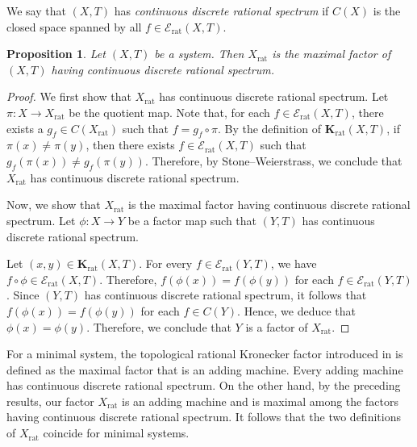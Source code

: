 \documentclass[11pt,reqno]{amsart}
\newcommand{\Krat}{\mathbf{K}_{\operatorname{rat}}}
\newtheorem{proposition}[proposition]{Proposition}
\theoremstyle{definition}
\theoremstyle{remark}
\begin{document}
We say that $(X,T)$ has \emph{continuous discrete rational spectrum} if $C(X)$ is the closed space spanned by all $f\in \mathcal{E}_{\operatorname{rat}}(X,T)$.

\begin{proposition}
    Let $(X,T)$ be a system. Then $X_{\operatorname{rat}}$ is the maximal factor of $(X,T)$ having continuous discrete rational spectrum.
\end{proposition}

\begin{proof}
    We first show that $X_{\operatorname{rat}}$ has continuous discrete rational spectrum. Let $\pi: X\to X_{\operatorname{rat}}$ be the quotient map. Note that, for each $f\in \mathcal{E}_{\operatorname{rat}}(X,T)$, there exists a $g_f\in C(X_{\operatorname{rat}})$ such that $f=g_f \circ \pi$. By the definition of $\Krat(X,T)$, if $\pi(x)\neq\pi(y)$, then there exists $f\in \mathcal{E}_{\operatorname{rat}}(X,T)$ such that $g_f(\pi(x))\neq g_f(\pi(y))$. Therefore, by Stone–Weierstrass, we conclude that $X_{\operatorname{rat}}$ has continuous discrete rational spectrum.

    Now, we show that $X_{\operatorname{rat}}$ is the maximal factor having continuous discrete rational spectrum. Let $\phi: X\to Y$ be a factor map such that $(Y,T)$ has continuous discrete rational spectrum.
    
    Let $(x,y)\in \Krat(X,T)$. For every $f\in \mathcal{E}_{\operatorname{rat}}(Y,T)$, we have $f \circ \phi \in \mathcal{E}_{\operatorname{rat}}(X,T)$. Therefore, $f(\phi(x))=f(\phi(y))$ for each $f\in \mathcal{E}_{\operatorname{rat}}(Y,T)$. Since $(Y,T)$ has continuous discrete rational spectrum, it follows that $f(\phi(x))=f(\phi(y))$ for each $f\in C(Y)$. Hence, we deduce that $\phi(x)=\phi(y)$. Therefore, we conclude that $Y$ is a factor of $X_{\operatorname{rat}}$.
\end{proof}

For a minimal system, the topological rational Kronecker factor introduced in \cite{Glasscock_Koutsogiannis_Richter_mult_comb_return:2019} is defined as the maximal factor that is an adding machine. Every adding machine has continuous discrete rational spectrum. On the other hand, by the preceding results, our factor $X_{\operatorname{rat}}$ is an adding machine and is maximal among the factors having continuous discrete rational spectrum. It follows that the two definitions of $X_{\operatorname{rat}}$ coincide for minimal systems.
\end{document}
